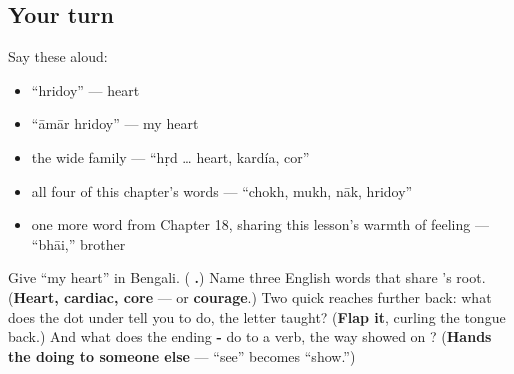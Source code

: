 \subsection*{Your turn}
Say these aloud:

\begin{itemize}
\raggedright
  \item \textquotedblleft{}hridoy\textquotedblright{} — heart
  \item \textquotedblleft{}āmār hridoy\textquotedblright{} — my heart
  \item the wide family — \textquotedblleft{}hṛd … heart, kardía, cor\textquotedblright{}
  \item all four of this chapter's words — \textquotedblleft{}chokh, mukh, nāk, hridoy\textquotedblright{}
  \item one more word from Chapter 18, sharing this lesson's warmth of feeling — \textquotedblleft{}bhāi,\textquotedblright{} brother
\end{itemize}

\begin{tcolorbox}[breakable,colback=teal!4,colframe=teal!35!black,title={Before you move on}]
Give \textquotedblleft{}my heart\textquotedblright{} in Bengali. (\textbf{ .}) Name three English words that share 's root. (\textbf{Heart, cardiac, core} — or \textbf{courage}.) Two quick reaches further back: what does the dot under  tell you to do, the letter  taught? (\textbf{Flap it}, curling the tongue back.) And what does the ending \textbf{-} do to a verb, the way  showed on ? (\textbf{Hands the doing to someone else} —  \textquotedblleft{}see\textquotedblright{} becomes  \textquotedblleft{}show.\textquotedblright{})
\end{tcolorbox}
